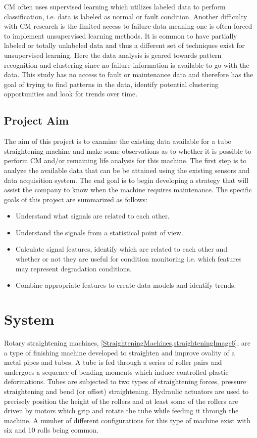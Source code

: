 \documentclass[]{article}
\begin{document}
\gls{CM} often uses supervised learning which utilizes labeled data to perform classification, i.e. data is labeled as normal or fault condition. Another difficulty with \gls{CM} research is the limited access to failure data meaning one is often forced to implement unsupervised learning methods. It is common to have partially labeled or totally unlabeled data and thus a different set of techniques exist for unsupervised learning. Here the data analysis is geared towards pattern recognition and clustering since no failure information is available to go with the data. This study has no access to fault or maintenance data and therefore has the goal of trying to find patterns in the data, identify potential clustering opportunities and look for trends over time.

\subsection{Project Aim}
The aim of this project is to examine the existing data available for a tube straightening machine and make some observations as to whether it is possible to perform \gls{CM} and/or remaining life analysis for this machine. The first step is to analyze the available data that can be be attained using the existing sensors and data acquisition system. The end goal is to begin developing a strategy that will assist the company to know when the machine requires maintenance. The specific goals of this project are summarized as follows:
\begin{itemize}
\item Understand what signals are related to each other.
\item Understand the signals from a statistical point of view.
\item Calculate signal features, identify which are related to each other and whether or not they are useful for condition monitoring i.e. which features may represent degradation conditions.
\item Combine appropriate features to create data models and identify trends.
\end{itemize}
\clearpage  

\section{System}
Rotary straightening machines, \cref{StraighteningMachines,straighteningImage6}, are a type of finishing machine developed to straighten and improve ovality of a metal pipes and tubes. A tube is fed through a series of roller pairs and undergoes a sequence of bending moments which induce controlled plastic deformations. Tubes are subjected to two types of straightening forces, pressure straightening and bend (or offset) straightening. Hydraulic actuators are used to precisely position the height of the rollers and at least some of the rollers are driven by motors which grip and rotate the tube while feeding it through the machine. A number of different configurations for this type of machine exist with six and 10 rolls being common. 
\end{document}
